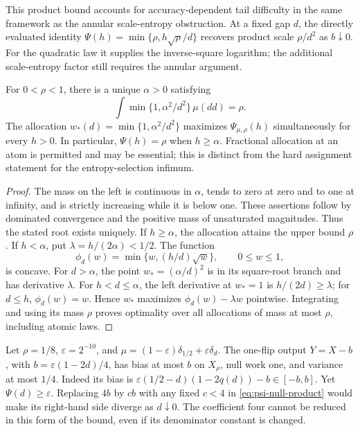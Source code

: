 This product bound accounts for accuracy-dependent tail difficulty in the
same framework as the annular scale-entropy obstruction.  At a fixed gap
\(d\), the directly evaluated identity
\(\Psi(h)=\min\{\rho,h\sqrt\rho/d\}\) recovers product scale
\(\rho/d^2\) as \(b\downarrow0\).  For the quadratic law it supplies
the inverse-square logarithm; the additional scale-entropy factor still
requires the annular argument.



\begin{proposition}
\label{prop:psi-optimizer}
For $0<\rho<1$, there is a unique $\alpha>0$ satisfying
\[
 \int\min\{1,\alpha^2/d^2\}\,\mu(dd)=\rho.
\]
The allocation $w_*(d)=\min\{1,\alpha^2/d^2\}$ maximizes
$\Psi_{\mu,\rho}(h)$ simultaneously for every $h>0$. In particular,
$\Psi(h)=\rho$ when $h\ge\alpha$. Fractional allocation at an atom is
permitted and may be essential; this is distinct from the hard
assignment statement for the entropy-selection infimum.
\end{proposition}
\begin{proof}
The mass on the left is continuous in $\alpha$, tends to zero at zero
and to one at infinity, and is strictly increasing while it is below
one. These assertions follow by dominated convergence and the positive
mass of unsaturated magnitudes. Thus the stated root exists uniquely.
If $h\ge\alpha$, the allocation attains the upper bound $\rho$.
If $h<\alpha$, put $\lambda=h/(2\alpha)<1/2$. The function
\[
 \phi_d(w)=\min\{w,(h/d)\sqrt w\},\qquad 0\le w\le1,
\]
is concave. For $d>\alpha$, the point $w_*=(\alpha/d)^2$ is in its
square-root branch and has derivative $\lambda$. For $h<d\le\alpha$,
the left derivative at $w_*=1$ is $h/(2d)\ge\lambda$; for $d\le h$,
$\phi_d(w)=w$. Hence $w_*$ maximizes $\phi_d(w)-\lambda w$
pointwise. Integrating and using its mass $\rho$ proves optimality over
all allocations of mass at most $\rho$, including atomic laws.
\end{proof}

\begin{remark}
Let $\rho=1/8$, $\varepsilon=2^{-10}$, and
$\mu=(1-\varepsilon)\delta_{1/2}+\varepsilon\delta_d$.
The one-flip output $Y=X-b$, with $b=\varepsilon(1-2d)/4$, has bias
at most $b$ on $X_\rho$, null work one, and variance at most $1/4$.
Indeed its bias is
$\varepsilon(1/2-d)(1-2q(d))-b\in[-b,b]$.
Yet $\Psi(d)\ge\varepsilon$. Replacing $4b$ by $cb$ with any fixed
$c<4$ in \eqref{eq:psi-null-product} would make its right-hand side
diverge as $d\downarrow0$. The coefficient four cannot be reduced in
this form of the bound, even if its denominator constant is changed.
\end{remark}

